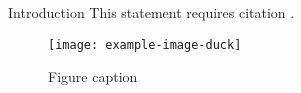 \documentclass{beamer}
\begin{document}
\begin{frame}[t,fragile]
\begin{columns}[t]
\begin{column}{\textwidth}
\begin{block}{Introduction}
This statement requires citation \cite{Smith:2012qr}.

\end{block}


\begin{figure}
\texttt{[image: example-image-duck]}
\caption{Figure caption}
\end{figure}


\end{column} %

\end{columns} %

\end{frame}
\end{document}
